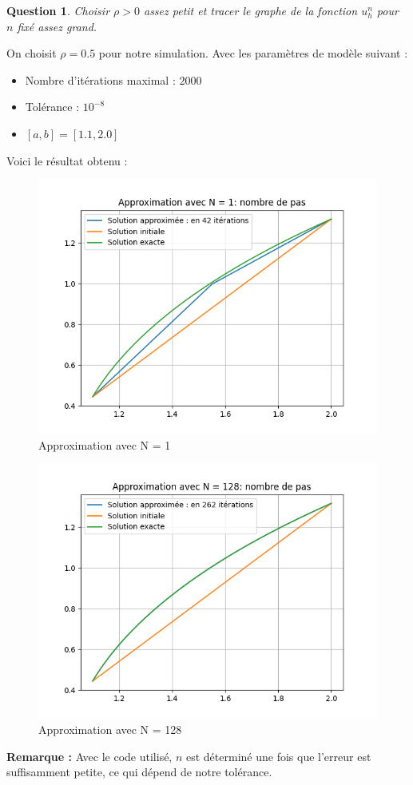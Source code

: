 \documentclass{article}
\newtheorem{question}{Question}[subsection]
\newenvironment{answer}
  {\color{blue}}
  {}
\newcommand{\QuestionAnswer}[2]{
    \begin{question}
        #1
    \end{question}
    \begin{answer}
        #2
    \end{answer}
}
\begin{document}
\QuestionAnswer{
    Choisir $\rho > 0$ assez petit et tracer le graphe de la fonction $u^n_h$ pour $n$ fixé assez grand.
}{
    On choisit $\rho = 0.5$ pour notre simulation.\newline 
    Avec les paramètres de modèle suivant :
    \begin{itemize}
        \item Nombre d'itérations maximal : $2000$
        \item Tolérance : $10^{-8}$
        \item $[a,b] = [1.1, 2.0]$
    \end{itemize}

    Voici le résultat obtenu :
    \begin{figure}[H]
        \centering
        \includegraphics[width=0.75\linewidth]{approxWith1.png}
        \caption{Approximation avec N = 1}
        \label{fig:approx_N1}
    \end{figure}

    \begin{figure}[H]
        \centering
        \includegraphics[width=0.75\linewidth]{approxWith128.png}
        \caption{Approximation avec N = 128}
        \label{fig:approx_N128}
    \end{figure}

    \textbf{Remarque :} Avec le code utilisé, $n$ est déterminé une fois que l'erreur est suffisamment petite, ce qui dépend de notre tolérance.
}
\end{document}
